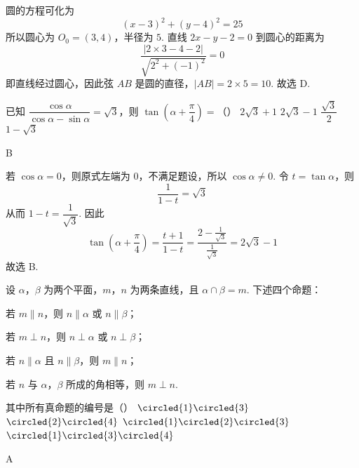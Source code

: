 \begin{solution}
圆的方程可化为
\[
(x-3)^2+(y-4)^2=25
\]
所以圆心为 \(O_0=(3,4)\)，半径为 \(5\). 直线 \(2x-y-2=0\) 到圆心的距离为
\[
\frac{|2\times3-4-2|}{\sqrt{2^2+(-1)^2}}=0
\]
即直线经过圆心，因此弦 \(AB\) 是圆的直径，\(|AB|=2\times5=10\). 故选 D.
\end{solution}

\begin{problem}
已知 \(\dfrac{\cos\alpha}{\cos\alpha-\sin\alpha}=\sqrt3\)，则 \(\tan\left(\alpha+\dfrac\pi4\right)=\)（\quad）
\choices
    {\(2\sqrt3+1\)}
    {\(2\sqrt3-1\)}
    {\(\dfrac{\sqrt3}{2}\)}
    {\(1-\sqrt3\)}
\end{problem}

\begin{answer}
B
\end{answer}

\begin{solution}
若 \(\cos\alpha=0\)，则原式左端为 \(0\)，不满足题设，所以 \(\cos\alpha\ne0\). 令 \(t=\tan\alpha\)，则
\[
\frac1{1-t}=\sqrt3
\]
从而 \(1-t=\dfrac1{\sqrt3}\). 因此
\[
\tan\left(\alpha+\frac\pi4\right)=\frac{t+1}{1-t}
=\frac{2-\frac1{\sqrt3}}{\frac1{\sqrt3}}
=2\sqrt3-1
\]
故选 B.
\end{solution}

\begin{problem}
设 \(\alpha\)，\(\beta\) 为两个平面，\(m\)，\(n\) 为两条直线，且 \(\alpha\cap\beta=m\). 下述四个命题：
\begin{circlelist}
\item 若 \(m\parallel n\)，则 \(n\parallel\alpha\) 或 \(n\parallel\beta\)；
\item 若 \(m\perp n\)，则 \(n\perp\alpha\) 或 \(n\perp\beta\)；
\item 若 \(n\parallel\alpha\) 且 \(n\parallel\beta\)，则 \(m\parallel n\)；
\item 若 \(n\) 与 \(\alpha\)，\(\beta\) 所成的角相等，则 \(m\perp n\).
\end{circlelist}
其中所有真命题的编号是（\quad）
\choices
    {\(\circled{1}\circled{3}\)}
    {\(\circled{2}\circled{4}\)}
    {\(\circled{1}\circled{2}\circled{3}\)}
    {\(\circled{1}\circled{3}\circled{4}\)}
\end{problem}

\begin{answer}
A
\end{answer}

